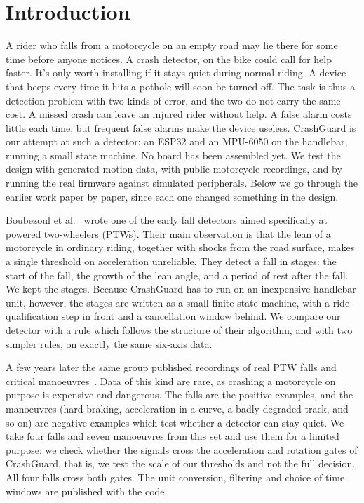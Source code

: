 \documentclass[10pt,a4paper]{article}
\begin{document}
\section{Introduction}
A rider who falls from a motorcycle on an empty road may lie there for some time before anyone notices. A crash detector, on the bike could call for help faster. It's only worth installing if it stays quiet during normal riding. A device that beeps every time it hits a pothole will soon be turned off. The task is thus a detection problem with two kinds of error, and the two do not carry the same cost. A missed crash can leave an injured rider without help. A false alarm costs little each time, but frequent false alarms make the device useless. CrashGuard is our attempt at such a detector: an ESP32 and an MPU-6050 on the handlebar, running a small state machine. No board has been assembled yet. We test the design with generated motion data, with public motorcycle recordings, and by running the real firmware against simulated peripherals. Below we go through the earlier work paper by paper, since each one changed something in the design.

Boubezoul et al.~\cite{boubezoul2013algorithm} wrote one of the early fall detectors aimed specifically at powered two-wheelers (PTWs). Their main observation is that the lean of a motorcycle in ordinary riding, together with shocks from the road surface, makes a single threshold on acceleration unreliable. They detect a fall in stages: the start of the fall, the growth of the lean angle, and a period of rest after the fall. We kept the stages. Because CrashGuard has to run on an inexpensive handlebar unit, however, the stages are written as a small finite-state machine, with a ride-qualification step in front and a cancellation window behind. We compare our detector with a rule which follows the structure of their algorithm, and with two simpler rules, on exactly the same six-axis data.

A few years later the same group published recordings of real PTW falls and critical manoeuvres~\cite{boubezoul2019dataset}. Data of this kind are rare, as crashing a motorcycle on purpose is expensive and dangerous. The falls are the positive examples, and the manoeuvres (hard braking, acceleration in a curve, a badly degraded track, and so on) are negative examples which test whether a detector can stay quiet. We take four falls and seven manoeuvres from this set and use them for a limited purpose: we check whether the signals cross the acceleration and rotation gates of CrashGuard, that is, we test the scale of our thresholds and not the full decision. All four falls cross both gates. The unit conversion, filtering and choice of time windows are published with the code.
\end{document}
